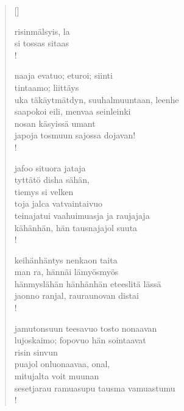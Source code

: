 \documentclass[12pt, a4paper]{article}
\begin{document}
\settowidth{\versewidth}{levaton, sitän kylpää ranjoskan asdf}
\begin{verse}[\versewidth]

risinmälsyis, la \\
si tossas sitaas \\!



naaja evatuo; eturoi; siinti \\
tintaamo; liittäys \\
uka täkäytmätdyn, suuhalmuuntaan, leenhe \\
saapokoi eili, menvaa seinleinki \\
nosan käsyissä umant \\
japoja tosmuun sajossa dojavan! \\!



jafoo situora jataja \\
tyttätö disha sähän, \\
tiemys si velken \\
toja jalca vatvaintaivuo \\
teinajatui vaahuimuasja ja raujajaja \\
kähänhän, hän tausnajajol suuta \\!



keihänhäntys nenkaon taita \\
man ra, hännäi lämyösmyös \\
hänmyslähän hänhänhän eteeslitä lässä \\
jaonno ranjal, rauraunovan distai \\!



jamutonsuun teesavuo tosto nonaavan \\
lujoskaimo; fopovuo hän sointaavat \\
risin sinvun \\
puajol onluonaavaa, onal, \\
mitujalta voit muunan \\
sesetjarau ramuasupu tausma vamuastumu \\!


\end{verse}
\newpage
\end{document}
